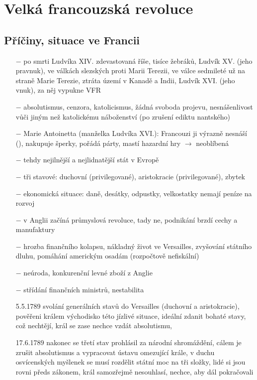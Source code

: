 \documentclass{article}
\begin{document}
\section*{Velká francouzská revoluce}

\subsection*{Příčiny, situace ve Francii}

\begin{itemize}
    \vspace{-0.5em}
    \setlength\itemsep{0.15em}
    \item[$-$] po smrti Ludvíka XIV. zdevastovaná říše, tisíce žebráků, Ludvík XV. (jeho pravnuk), ve válkách slezských proti Marii Terezii, ve válce sedmileté už na straně Marie Terezie, ztráta území v Kanadě a Indii, Ludvík XVI. (jeho vnuk), za něj vypukne VFR
    \item[$-$] absolutismus, cenzora, katolicismus, žádná svoboda projevu, nesnášenlivost vůči jiným než katolickému náboženství (po zrušení ediktu nantského)
    \item[$-$] Marie Antoinetta (manželka Ludvíka XVI.): Francouzi ji výrazně nesnáší (), nakupuje šperky, pořádá párty, mastí hazardní hry $\rightarrow$ neoblíbená
    \item[$-$] tehdy nejilnější a nejlidnatější stát v Evropě
    \item[$-$] tři stavové: duchovní (privilegované), aristokracie (privilegované), zbytek
    \item[$-$] ekonomická situace: daně, desátky, odpustky, velkostatky nemají peníze na rozvoj
    \item[$-$] v Anglii začíná průmyslová revoluce, tady ne, podnikání brzdí cechy a manufaktury
    \item[$-$] hrozba finančního kolapsu, nákladný život ve Versailles, zvyšování státního dluhu, pomáhání americkým osadám (rozpočtově nefiskální)
    \item[$-$] neúroda, konkurenční levné zboží z Anglie
    \item[$-$] střídání finančních ministrů, nestabilita
    \item[5.5.1789] svolání generálních stavů do Versailles (duchovní a aristokracie), pověřeni králem východisko této jízlivé situace, ideální zdanit bohaté stavy, což nechtějí, král se zase nechce vzdát absolutismu,
    \item[17.6.1789] nakonec se třetí stav prohlásil za národní shromáždění, cálem je zrušit absolutismus a vypracovat ústavu omezující krále, v duchu osvícenských myšlenek se musí rozdělit státní moc na tři složky, lidé si jsou rovni předs zákonem, král samozřejmě nesouhlasí, nechce, aby dál pokračovali

\end{itemize}
\end{document}
